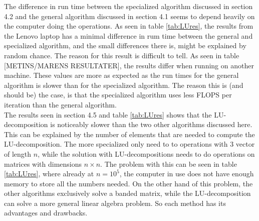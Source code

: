 \documentclass[a4paper,10pt]{article}
\begin{document}
The difference in run time between the specialized algorithm discussed in section 4.2 and the general algorithm discussed in section 4.1 seems to depend heavily on the computer doing the operations. As seen in table \ref{tab:LUres}, the results from the Lenovo laptop has a minimal difference in rum time between the general and specialized algorithm, and the small differences there is, might be explained by random chance. The reason for this result is difficult to tell. As seen in table [METINS/MARENS RESULTATER], the results differ when running on another machine. These values are more as expected as the run times for the general algorithm is slower than for the specialized algorithm. The reason this is (and should be) the case, is that the specialized algorithm uses less FLOPS per iteration than the general algorithm.\\

The results seen in section 4.5 and table \ref{tab:LUres} shows that the LU-decomposition is noticeably slower than the two other algorithms discussed here. This can be explained by the number of elements that are needed to compute the LU-decomposition. The more specialized only need to to operations with 3 vector of length $n$, while the solution with LU-decompositions needs to do operations on matrices with dimensions $n\times n$. The problem with this can be seen in table \ref{tab:LUres}, where already at $n = 10^5$, the computer in use does not have enough memory to store all the numbers needed. On the other hand of this problem, the other algorithms exclusively solve a banded matrix, while the LU-decomposition can solve a more general linear algebra problem. So each method has its advantages and drawbacks.
\end{document}
